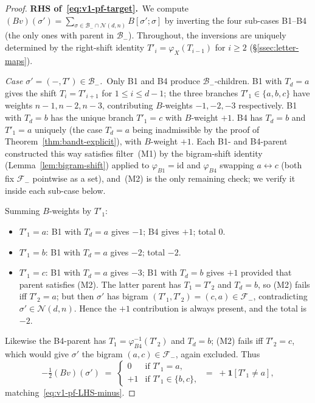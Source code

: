 \documentclass{amsart}
\theoremstyle{definition}
\theoremstyle{remark}
\begin{document}
\begin{proof}
\smallskip\noindent\textbf{RHS of~\eqref{eq:v1-pf-target}.}\
We compute $(B v)(\sigma') = \sum_{\sigma \in \mathcal{B}_- \cap
\mathcal{N}(d, n)} B[\sigma'; \sigma]$ by inverting the four
sub-cases B1--B4 (the only ones with parent in $\mathcal{B}_-$).
Throughout, the inversions are uniquely determined by the
right-shift identity $T'_i = \varphi_X(T_{i-1})$ for $i \ge 2$
(\S\ref{ssec:letter-maps}).

\emph{Case $\sigma' = (-, T') \in \mathcal{B}_-$.}\ Only B1 and
B4 produce $\mathcal{B}_-$-children.  B1 with $T_d = a$ gives the
shift $T_i = T'_{i+1}$ for $1 \le i \le d-1$; the three branches
$T'_1 \in \{a, b, c\}$ have weights $n-1, n-2, n-3$, contributing
$B$-weights $-1, -2, -3$ respectively.  B1 with $T_d = b$ has the
unique branch $T'_1 = c$ with $B$-weight $+1$.  B4 has $T_d = b$
and $T'_1 = a$ uniquely (the case $T_d = a$ being inadmissible by
the proof of Theorem~\ref{thm:bandt-explicit}), with $B$-weight
$+1$.  Each B1- and B4-parent constructed this way satisfies
filter~(M1) by the bigram-shift identity
(Lemma~\ref{lem:bigram-shift}) applied to $\varphi_{B1} = \mathrm{id}$
and $\varphi_{B4}$ swapping $a \leftrightarrow c$ (both fix
$\mathcal{F}_-$ pointwise as a set), and~(M2) is the only
remaining check; we verify it inside each sub-case below.

Summing $B$-weights by $T'_1$:
\begin{itemize}
\item $T'_1 = a$: B1 with $T_d = a$ gives $-1$; B4 gives $+1$;
  total $0$.
\item $T'_1 = b$: B1 with $T_d = a$ gives $-2$; total $-2$.
\item $T'_1 = c$: B1 with $T_d = a$ gives $-3$; B1 with
  $T_d = b$ gives $+1$ provided that parent satisfies (M2).
  The latter parent has $T_1 = T'_2$ and $T_d = b$, so (M2) fails
  iff $T'_2 = a$; but then $\sigma'$ has bigram $(T'_1, T'_2) =
  (c, a) \in \mathcal{F}_-$, contradicting $\sigma' \in
  \mathcal{N}(d, n)$.  Hence the $+1$ contribution is always
  present, and the total is $-2$.
\end{itemize}
Likewise the B4-parent has $T_1 = \varphi_{B4}^{-1}(T'_2)$ and
$T_d = b$; (M2) fails iff $T'_2 = c$, which would give $\sigma'$
the bigram $(a, c) \in \mathcal{F}_-$, again excluded.  Thus
\begin{equation}\label{eq:v1-pf-Bv-minus}
  -\tfrac{1}{2} (B v)(\sigma')
    \;=\;
    \begin{cases}
      0  & \text{if } T'_1 = a, \\
      +1 & \text{if } T'_1 \in \{b, c\},
    \end{cases}
  \;=\; +\mathbf{1}[T'_1 \ne a],
\end{equation}
matching~\eqref{eq:v1-pf-LHS-minus}.


\end{proof}
\end{document}
